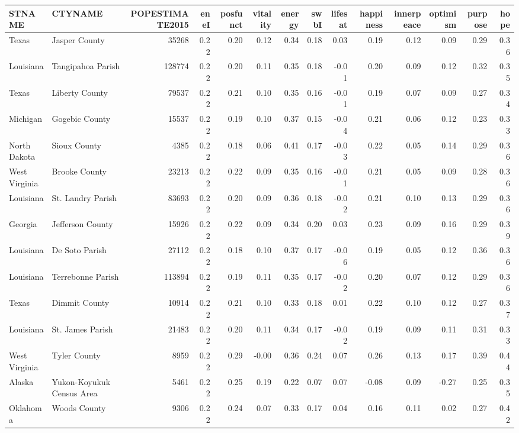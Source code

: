 \documentclass[10pt, letterpaper]{article}
\renewcommand\arraystretch{.9}                    %
\begin{document}
\begin{spacing}{1.4}
 
\begin{table}
  \centering
{\renewcommand{\arraystretch}{.5}\tiny
  \begin{tabular}{llrrrrrrrrrrrr}
\hline
STNAME & CTYNAME & POPESTIMATE2015 & eneI & posfunct & vitality & energy & swbI & lifesat & happiness & innerpeace & optimism & purpose & hope \\
\hline
Texas & Jasper County & 35268 & 0.22 & 0.20 & 0.12 & 0.34 & 0.18 & 0.03 & 0.19 & 0.12 & 0.09 & 0.29 & 0.36 \\
Louisiana & Tangipahoa Parish & 128774 & 0.22 & 0.20 & 0.11 & 0.35 & 0.18 & -0.01 & 0.20 & 0.09 & 0.12 & 0.32 & 0.35 \\
Texas & Liberty County & 79537 & 0.22 & 0.21 & 0.10 & 0.35 & 0.16 & -0.01 & 0.19 & 0.07 & 0.09 & 0.27 & 0.34 \\
Michigan & Gogebic County & 15537 & 0.22 & 0.19 & 0.10 & 0.37 & 0.15 & -0.04 & 0.21 & 0.06 & 0.12 & 0.23 & 0.33 \\
North Dakota & Sioux County & 4385 & 0.22 & 0.18 & 0.06 & 0.41 & 0.17 & -0.03 & 0.22 & 0.05 & 0.14 & 0.29 & 0.36 \\
West Virginia & Brooke County & 23213 & 0.22 & 0.22 & 0.09 & 0.35 & 0.16 & -0.01 & 0.21 & 0.05 & 0.09 & 0.28 & 0.36 \\
Louisiana & St. Landry Parish & 83693 & 0.22 & 0.20 & 0.09 & 0.36 & 0.18 & -0.02 & 0.21 & 0.10 & 0.13 & 0.29 & 0.36 \\
Georgia & Jefferson County & 15926 & 0.22 & 0.22 & 0.09 & 0.34 & 0.20 & 0.03 & 0.23 & 0.09 & 0.16 & 0.29 & 0.39 \\
Louisiana & De Soto Parish & 27112 & 0.22 & 0.18 & 0.10 & 0.37 & 0.17 & -0.06 & 0.19 & 0.05 & 0.12 & 0.36 & 0.36 \\
Louisiana & Terrebonne Parish & 113894 & 0.22 & 0.19 & 0.11 & 0.35 & 0.17 & -0.02 & 0.20 & 0.07 & 0.12 & 0.29 & 0.36 \\
Texas & Dimmit County & 10914 & 0.22 & 0.21 & 0.10 & 0.33 & 0.18 & 0.01 & 0.22 & 0.10 & 0.12 & 0.27 & 0.37 \\
Louisiana & St. James Parish & 21483 & 0.22 & 0.20 & 0.11 & 0.34 & 0.17 & -0.02 & 0.19 & 0.09 & 0.11 & 0.31 & 0.33 \\
West Virginia & Tyler County & 8959 & 0.22 & 0.29 & -0.00 & 0.36 & 0.24 & 0.07 & 0.26 & 0.13 & 0.17 & 0.39 & 0.44 \\
Alaska & Yukon-Koyukuk Census Area & 5461 & 0.22 & 0.25 & 0.19 & 0.22 & 0.07 & 0.07 & -0.08 & 0.09 & -0.27 & 0.25 & 0.35 \\
Oklahoma & Woods County & 9306 & 0.22 & 0.24 & 0.07 & 0.33 & 0.17 & 0.04 & 0.16 & 0.11 & 0.02 & 0.27 & 0.42 \\

\end{tabular}}
\end{table}
\end{spacing}
\end{document}
